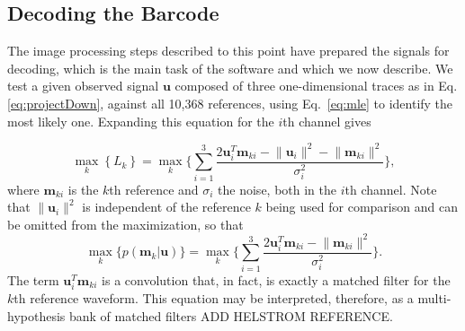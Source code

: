 \subsection{Decoding the Barcode}
The image processing steps described to this point have prepared the signals for decoding, which is the main task of the software and which we now describe.  We test a given observed signal $\mathbf{u}$ composed of three one-dimensional traces as in Eq. 
\ref{eq:projectDown}, against all 10,368 references, using Eq.~\ref{eq:mle} to identify the most likely one. Expanding this equation for the $i$th channel gives

\begin{equation}
\max_k   \left\{ L_k \right\} =  \max_k  \Bigg\{ \sum_{i=1}^3  \frac{  2 \mathbf{u}_i ^T \mathbf{m}_{ki} - \lVert \mathbf{u}_i \rVert^2  - \lVert \mathbf{m}_{ki} \rVert^2   }{\sigma_i^2}  \Bigg\}, 
\end{equation}
where $\mathbf{m}_{ki}$  is the $k$th reference and $\sigma_i$ the noise, both in the $i$th channel. Note that $\lVert \mathbf{u}_i \rVert^2$  is independent of the reference $k$ being used for comparison and can be omitted from the maximization, so that
\begin{equation}
\max_k   \big\{  p(\mathbf{m}_k|\mathbf{u}) \big\} =  \max_k  \Bigg\{ \sum_{i=1}^3  \frac{  2 \mathbf{u}_i ^T \mathbf{m}_{ki}  - \lVert \mathbf{m}_{ki} \rVert^2   }{\sigma_i^2}  \Bigg\}. 
\end{equation}
The term $\mathbf{u}_i ^T \mathbf{m}_{ki}$ is a convolution that, in fact, is exactly a matched filter for the $k$th reference waveform. This equation may be interpreted, therefore, as a multi-hypothesis bank of matched filters ADD HELSTROM REFERENCE.

